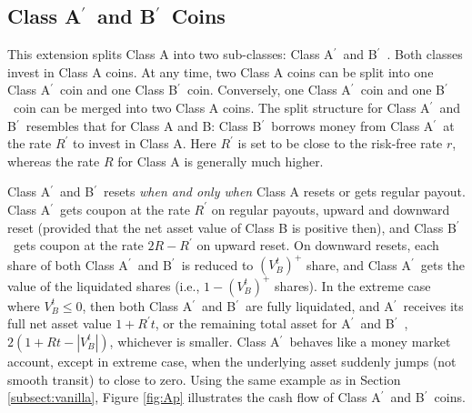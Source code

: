 \documentclass[11pt]{article}%
\numberwithin{equation}{section}
\theoremstyle{plain}
\newcommand{\Ap}{A\ensuremath{^\prime}~}
\newcommand{\Bp}{B\ensuremath{^\prime}~}
\begin{document}
\subsection{\texorpdfstring{Class \Ap and \Bp Coins}{Lg}}\label{subsect:Ap}
This extension splits Class A into two sub-classes: Class \Ap and \Bp. Both classes invest in Class A coins. At any time, two Class A coins can be split into one Class \Ap coin and one Class \Bp coin. Conversely, one Class \Ap coin and one \Bp coin can be merged into two Class A coins. The split structure for Class \Ap and \Bp resembles that for Class A and B: Class \Bp borrows money from Class \Ap at the rate $R^\prime$ to invest in Class A. Here $R^\prime$ is set to be close to the risk-free rate $r$, whereas the rate $R$ for Class A is generally much higher.

Class \Ap and \Bp resets {\it when and only when} Class A resets or gets regular payout. Class \Ap gets coupon at the rate $R^\prime$ on regular payouts, upward and downward reset (provided that the net asset value of Class B is positive then), and Class \Bp gets coupon at the rate $2R-R^\prime$ on upward reset. On downward resets, each share of both Class \Ap and \Bp is reduced to $(V_B^t)^+$ share, and Class \Ap gets the value of the liquidated shares (i.e., $1-(V_B^t)^+$ shares). In the extreme case where $V_B^t\le 0$, then both Class \Ap and \Bp are fully liquidated, and \Ap receives its full net asset value $1+R^\prime t$, or the remaining total asset for \Ap and \Bp, $2(1+Rt-|V_B^t|)$, whichever is smaller. Class \Ap behaves like a money market account, except in extreme case, when the underlying asset suddenly jumps (not smooth transit) to close to zero. Using the same example as in Section \ref{subsect:vanilla}, Figure \ref{fig:Ap} illustrates the cash flow of Class \Ap and \Bp coins.





\end{document}
